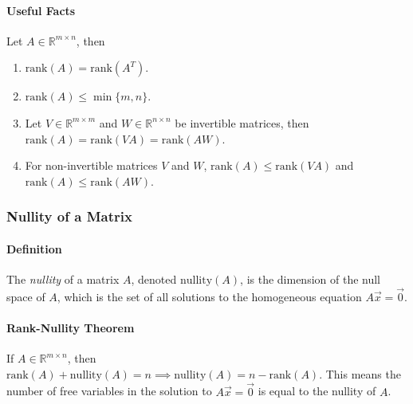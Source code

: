\paragraph*{Useful Facts}
Let $A \in \mathbb{R}^{m \times n}$, then
\begin{enumerate}
    \item $\mathrm{rank}(A) = \mathrm{rank}(A^T)$.
    \item $\mathrm{rank}(A) \leq \min\{m, n\}$.
    \item Let $V \in \mathbb{R}^{m \times m}$ and $W \in \mathbb{R}^{n \times n}$ be invertible matrices, then $\mathrm{rank}(A) = \mathrm{rank}(VA) = \mathrm{rank}(AW)$.
    \item For non-invertible matrices $V$ and $W$, $\mathrm{rank}(A) \leq \mathrm{rank}(VA)$ and $\mathrm{rank}(A) \leq \mathrm{rank}(AW)$.
\end{enumerate}

\subsubsection*{Nullity of a Matrix}
\paragraph*{Definition}
The \emph{nullity} of a matrix $A$, denoted $\mathrm{nullity}(A)$, is the dimension of the null space of $A$, 
which is the set of all solutions to the homogeneous equation $A\vec{x} = \vec{0}$.

\paragraph*{Rank-Nullity Theorem}
If $A \in \mathbb{R}^{m \times n}$, then $\mathrm{rank}(A) + \mathrm{nullity}(A) = n \implies \mathrm{nullity}(A) = n - \mathrm{rank}(A)$.
This means the number of free variables in the solution to $A\vec{x} = \vec{0}$ is equal to the nullity of $A$.